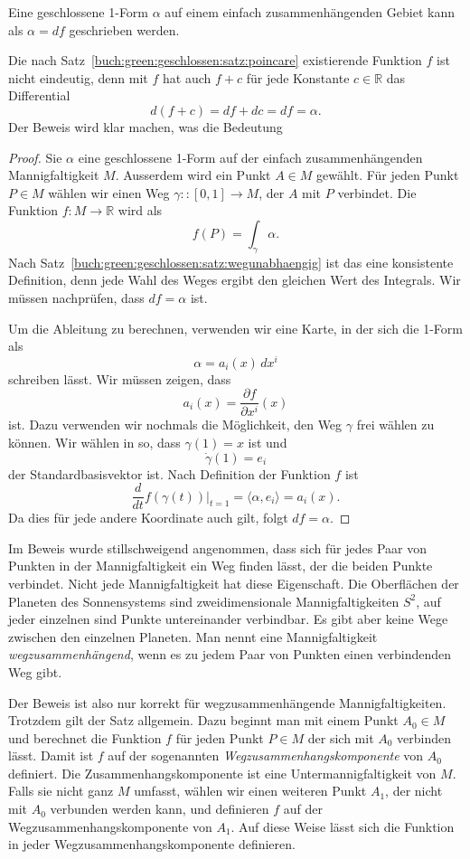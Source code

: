 \begin{satz}
\label{buch:green:geschlossen:satz:poincare}
Eine geschlossene 1-Form $\alpha$ auf einem einfach zusammenhängenden
Gebiet kann als $\alpha=df$ geschrieben werden.
\end{satz}

Die nach Satz~\ref{buch:green:geschlossen:satz:poincare}
existierende Funktion $f$ ist nicht eindeutig, denn mit $f$ hat
auch $f+c$ für jede Konstante $c\in\mathbb{R}$ das Differential
\[
d(f+c) = df + dc = df = \alpha.
\]
Der Beweis wird klar machen, was die Bedeutung

\begin{proof}
Sie $\alpha$ eine geschlossene 1-Form auf der einfach zusammenhängenden
Mannigfaltigkeit $M$.
Ausserdem wird ein Punkt $A\in M$ gewählt.
Für jeden Punkt $P\in M$ wählen wir einen Weg $\gamma:\colon[0,1]\to M$,
der $A$ mit $P$ verbindet.
Die Funktion $f\colon M\to\mathbb{R}$ wird als
\[
f(P) = \int_{\gamma} \alpha.
\]
Nach Satz~\ref{buch:green:geschlossen:satz:wegunabhaengig} ist das eine
konsistente Definition, denn jede Wahl des Weges ergibt den gleichen
Wert des Integrals.
Wir müssen nachprüfen, dass $df=\alpha$ ist.

Um die Ableitung zu berechnen, verwenden wir eine Karte, in der sich die
1-Form als
\[
\alpha = a_i(x)\, dx^i
\]
schreiben lässt.
Wir müssen zeigen, dass
\[
a_i(x) = \frac{\partial f}{\partial x^i}(x)
\]
ist.
Dazu verwenden wir nochmals die Möglichkeit, den Weg $\gamma$ frei wählen
zu können.
Wir wählen in so, dass $\gamma(1)=x$ ist und
\[
\dot{\gamma}(1) = e_i
\]
der Standardbasisvektor ist.
Nach Definition der Funktion $f$ ist
\[
\frac{d}{dt}
f(\gamma(t))
\biggl|_{t=1}
=
\langle
\alpha,
e_i
\rangle
=
a_i(x).
\]
Da dies für jede andere Koordinate auch gilt, folgt $df=\alpha$.
\end{proof}

Im Beweis wurde stillschweigend angenommen, dass sich für jedes
Paar von Punkten in der Mannigfaltigkeit ein Weg finden lässt, der
die beiden Punkte verbindet.
Nicht jede Mannigfaltigkeit hat diese Eigenschaft.
Die Oberflächen der Planeten des Sonnensystems sind zweidimensionale
Mannigfaltigkeiten $S^2$, auf jeder einzelnen sind Punkte untereinander
verbindbar.
Es gibt aber keine Wege zwischen den einzelnen Planeten.
Man nennt eine Mannigfaltigkeit {\em wegzusammenhängend}, wenn es zu jedem
Paar von Punkten einen verbindenden Weg gibt.

Der Beweis ist also nur korrekt für wegzusammenhängende Mannigfaltigkeiten.
Trotzdem gilt der Satz allgemein.
Dazu beginnt man mit einem Punkt $A_0\in M$ und berechnet die Funktion $f$
für jeden Punkt $P\in M$ der sich mit $A_0$ verbinden lässt.
Damit ist $f$ auf der sogenannten {\em Wegzusammenhangskomponente} von $A_0$
definiert.
Die Zusammenhangskomponente ist eine Untermannigfaltigkeit von $M$.
Falls sie nicht ganz $M$ umfasst, wählen wir einen weiteren Punkt $A_1$,
der nicht mit $A_0$ verbunden werden kann, und definieren $f$ auf der
Wegzusammenhangskomponente von $A_1$.
Auf diese Weise lässt sich die Funktion in jeder Wegzusammenhangskomponente
definieren.

